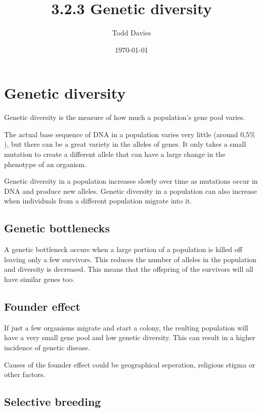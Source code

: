 \documentclass{article}
\author{Todd Davies}
\title{3.2.3 Genetic diversity}
\date{\today}
\begin{document}
\lhead{\today}

\maketitle

\section*{Genetic diversity}
\thispagestyle{empty}

Genetic diversity is the measure of how much a population's gene pool varies.

The actual base sequence of DNA in a population varies very little (around
0,5$\%$), but there can be a great variety in the alleles of genes. It only
takes a small mutation to create a different allele that can have a large change
in the phenotype of an organism. 

Genetic diversity in a population increases slowly over time as mutations occur
in DNA and produce new alleles. Genetic diversity in a population can also
increase when individuals from a different population migrate into it.

\subsection*{Genetic bottlenecks}

A genetic bottleneck occurs when a large portion of a population is killed off
leaving only a few survivors. This reduces the number of alleles in the
population and diversity is decreased. This means that the offspring of the
survivors will all have similar genes too.

\subsection*{Founder effect}

If just a few organisms migrate and start a colony, the reulting population will
have a very small gene pool and low genetic diversity. This can result in a
higher incidence of genetic disease.

Causes of the founder effect could be geographical seperation, religious stigma
or other factors.

\subsection*{Selective breeding}
\end{document}
